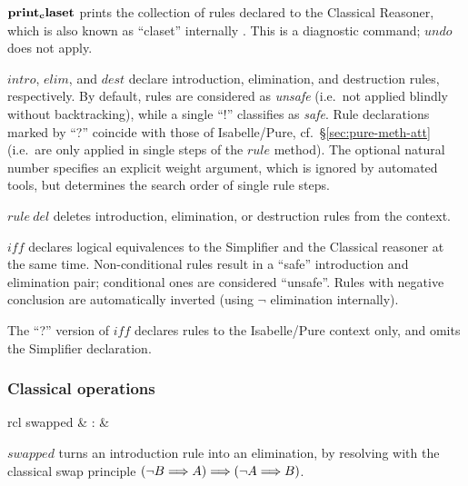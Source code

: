 \begin{descr}

\item [${\mathord{\mathbf{print_claset}}}$] prints the collection of rules declared to
  the Classical Reasoner, which is also known as ``claset'' internally
  \cite{isabelle-ref}.  This is a diagnostic command; $undo$ does not apply.
  
\item [$intro$, $elim$, and $dest$] declare introduction, elimination, and
  destruction rules, respectively.  By default, rules are considered as
  \emph{unsafe} (i.e.\ not applied blindly without backtracking), while a
  single ``!'' classifies as \emph{safe}.  Rule declarations marked by ``?''
  coincide with those of Isabelle/Pure, cf.\ \S\ref{sec:pure-meth-att} (i.e.\ 
  are only applied in single steps of the $rule$ method).  The optional
  natural number specifies an explicit weight argument, which is ignored by
  automated tools, but determines the search order of single rule steps.

\item [$rule~del$] deletes introduction, elimination, or destruction rules from
  the context.

\item [$iff$] declares logical equivalences to the Simplifier and the
  Classical reasoner at the same time.  Non-conditional rules result in a
  ``safe'' introduction and elimination pair; conditional ones are considered
  ``unsafe''.  Rules with negative conclusion are automatically inverted
  (using $\lnot$ elimination internally).

  The ``?'' version of $iff$ declares rules to the Isabelle/Pure context only,
  and omits the Simplifier declaration.

\end{descr}


\subsubsection{Classical operations}


\begin{matharray}{rcl}
  swapped & : & \isaratt \\
\end{matharray}

\begin{descr}

\item [$swapped$] turns an introduction rule into an elimination, by resolving
  with the classical swap principle $(\lnot B \Longrightarrow A) \Longrightarrow (\lnot A \Longrightarrow B)$.

\end{descr}


